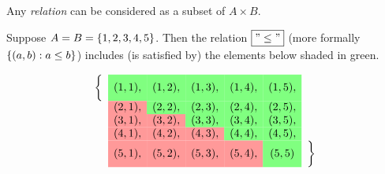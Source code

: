 \documentclass[10pt]{beamer}
\begin{document}
\begin{frame}


\begin{myyellowbox}[title=Perspective on Relations]
Any \textit{relation} can be considered as a subset of $A \times B$.
\end{myyellowbox}

\begin{mygreenbox}[title=Example]
Suppose $A=B=\{ {1,2,3,4,5} \}$.  Then the relation $\boxed{"\leq"}$ (more formally $\{ {(a,b): a \leq b} \}$) includes (is satisfied by) the elements below shaded in green.
\vfill 

    \[
    \begin{array}{ccccccc}
        \bigg\{ &   \cellcolor{green!50} (1,1), & \cellcolor{green!50} (1,2), & \cellcolor{green!50} (1,3), & \cellcolor{green!50} (1,4), & \cellcolor{green!50} (1,5), &\\
         & \cellcolor{red!40} (2,1), & \cellcolor{green!50} (2,2), & \cellcolor{green!50} (2,3), & \cellcolor{green!50} (2,4), & \cellcolor{green!50} (2,5), &\\
        & \cellcolor{red!40} (3,1), & \cellcolor{red!40} (3,2), & \cellcolor{green!50} (3,3), & \cellcolor{green!50} (3,4), & \cellcolor{green!50} (3,5), &\\
        & \cellcolor{red!40} (4,1), & \cellcolor{red!40} (4,2), & \cellcolor{red!40} (4,3), & \cellcolor{green!50} (4,4), & \cellcolor{green!50} (4,5), & \\
        & \cellcolor{red!40} (5,1), & \cellcolor{red!40} (5,2), & \cellcolor{red!40} (5,3), & \cellcolor{red!40} (5,4), & \cellcolor{green!50} (5,5) & \bigg\} \\
    \end{array}
    \]
\end{mygreenbox}
\end{frame}
\end{document}
